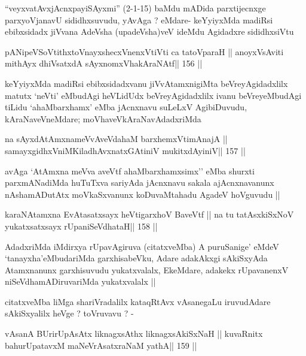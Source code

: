 \begin{artha}
``veyxvatAvxjAcnxpayiSAyxmi'' (2-1-15) baMdu mADida parxtijecnxge
  parxyoVjanavU sididhxsuvudu, yAvAga ? eMdare- keYyiyxMda madiRsi
  ebibxsidadx jiVvana AdeVsha (upadeVsha)veV ideMdu Agidadxre sididhxsiVtu
\end{artha}

\begin{shl}
pANipeVSoVtithxtoV\s nayxshecxVnenxVtiVti ca tatoV\s paraH ||
anoyxV\s sAviti mithAyx dhiVsatxdA sAyxnomxVhakAraNAtf\hfill || 156 ||
\end{shl}

\begin{artha}
keYyiyxMda madiRsi ebibxsidadxvanu jiVvAtamxnigiMta beVreyAgidadxlilx
matutx `neVti' eMbudAgi heVLidUdx beVreyAgidadxlilx ivanu
beVreyeMbudAgi tiLidu `ahaMbarxhamx' eMba jAcnxnavu suLeLxV
AgibiDuvudu, kAraNaveVneMdare; moVhaveVkAraNavAdadxriMda
\end{artha}

\begin{shl}
na sAyxdAtAmxnameVvAveVdahaM barxhemxVtimAnajA ||
samayxgidhxVniMKiladhAvxnatxGAtiniV mukitxdAyiniV\hfill || 157 ||
\end{shl}

\begin{artha}
avAga `AtAmxna meVva aveVtf ahaMbarxhamxsimx'' eMba shurxti
parxmANadiMda huTuTxva sariyAda jAcnxnavu sakala ajAcnxnavanunx
nAshamADutAtx moVkaSxvanunx koDuvaMtahadu AgadeV hoVguvudu ||
\end{artha}

\begin{shl}
karaNAtamxna EvAtasatxsayx heVtigarxhoV BaveVtf ||
na tu tatAsxkiSxNoV yukatxsatxsayx rUpaniSeVdhataH\hfill || 158 ||
\end{shl}

\begin{artha}
AdadxriMda iMdirxya rUpavAgiruva (citatxveMba) A puruSanige' eMdeV
`tanayxha'eMbudariMda garxhisabeVku, Adare adakAkxgi sAkiSxyAda
Atamxnanunx garxhisuvudu yukatxvalalx, EkeMdare, adakekx rUpavanenxV
niSeVdhamADiruvariMda yukatxvalalx ||
\end{artha}

\begin{artha}
citatxveMba liMga shariVradalilx kataqRtAvx vAsanegaLu iruvudAdare
sAkiSxyalilx heVge ? toVruvavu ? -
\end{artha}

\begin{shl}
vAsanA BUrirUpAsAtx liknagxsAthx liknagxsAkiSxNaH ||
kuvaRnitx bahurUpatavxM maNeVrAsatxraNaM yathA\hfill || 159 ||
\end{shl}

